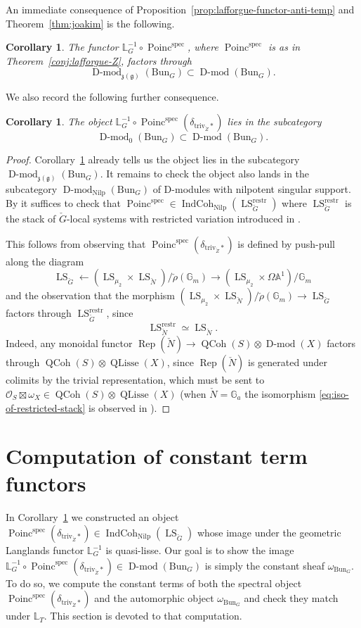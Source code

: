 \documentclass[11pt]{amsart}
\newcommand{\fg}{\mathfrak{g}}
\newcommand{\fz}{\mathfrak{z}}
\newcommand{\bG}{\mathbb{G}}
\newcommand{\bA}{\mathbb{A}}
\newcommand{\cO}{{\mathcal O}}
\newcommand{\triv}{\mathrm{triv}}
\newcommand{\spec}{\mathrm{spec}}
\newcommand{\Rep}{\operatorname{Rep}}
\newcommand{\Bun}{{\mathrm{Bun}}}
\newcommand{\Poinc}{\operatorname{Poinc}}
\newcommand{\Nilp}{\mathrm{Nilp}}
\DeclareMathOperator{\QCoh}{QCoh}
\DeclareMathOperator{\Dmod}{D-mod}
\DeclareMathOperator{\IndCoh}{IndCoh}
\DeclareMathOperator{\LS}{LS}
\newtheorem{cor}[thm]{Corollary}
\theoremstyle{remark}
\theoremstyle{definition}
\begin{document}
An immediate consequence of Proposition~\ref{prop:lafforgue-functor-anti-temp} and Theorem~\ref{thm:joakim} is the following.
\begin{cor}\label{cor:poincare-factors}
    The functor $\mathbb L_G^{-1}\circ\Poinc^\spec$, where $\Poinc^\spec$ is as in Theorem~\ref{conj:lafforgue-Z}, factors through
    \[
    \Dmod_{\fz(\fg)}(\Bun_G)\subset\Dmod(\Bun_G).
    \]
\end{cor}
We also record the following further consequence.
\begin{cor}\label{cor:poincare-factors2}
    The object $\mathbb L_G^{-1}\circ\Poinc^\spec(\delta_{\triv_{\check Z}*})$ lies in the subcategory
    \[
    \Dmod_0(\Bun_G)\subset\Dmod(\Bun_G).
    \]
\end{cor}
\begin{proof}
    Corollary~\ref{cor:poincare-factors} already tells us the object lies in the subcategory $\Dmod_{\fz(\fg)}(\Bun_G)$. It remains to check the object also lands in the subcategory $\Dmod_\Nilp(\Bun_G)$ of D-modules with nilpotent singular support. By \cite[Proposition~14.5.3]{AGKRRV} it suffices to check that $\Poinc^\spec\in\IndCoh_\Nilp(\LS_{\check G}^{\mathrm{restr}})$ where $\LS_{\check G}^{\mathrm{restr}}$ is the stack of $\check G$-local systems with restricted variation introduced in \cite[\S1.4]{AGKRRV}.

This follows from observing that $\Poinc^\spec(\delta_{\triv_{\check Z}*})$ is defined by push-pull along the diagram
\[
\LS_{\check G}\leftarrow(\LS_{\mu_2}\times\LS_{\check N})/\check\rho(\bG_m)\to (\LS_{\mu_2}\times\Omega\bA^1)/\bG_m
\]
and the observation that the morphism $(\LS_{\mu_2}\times\LS_{\check N})/\check\rho(\bG_m)\to\LS_{\check G}$ factors through $\LS_{\check G}^{\mathrm{restr}}$, since 
\begin{equation}\label{eq:iso-of-restricted-stack}\LS_{\check N}^{\mathrm{restr}}\simeq\LS_{\check N}.\end{equation}
Indeed, any monoidal functor $\Rep(\check N)\to\QCoh(S)\otimes\Dmod(X)$ factors through $\QCoh(S)\otimes\operatorname{QLisse}(X)$, since $\Rep(\check N)$ is generated under colimits by the trivial representation, which must be sent to $\cO_S\boxtimes\omega_X\in\QCoh(S)\otimes\operatorname{QLisse}(X)$ (when $\check N=\bG_a$ the isomorphism \eqref{eq:iso-of-restricted-stack} is observed in \cite[\S1.5.2]{AGKRRV}).
\end{proof}

\section{Computation of constant term functors}\label{sec:some-computations}
In Corollary~\ref{cor:poincare-factors2} we constructed an object $\Poinc^\spec(\delta_{\triv_{\check Z}*})\in\IndCoh_\Nilp(\LS_{\check G})$ whose image under the geometric Langlands functor $\mathbb L_G^{-1}$ is quasi-lisse. Our goal is to show the image $\mathbb L_G^{-1}\circ\Poinc^\spec(\delta_{\triv_{\check Z}*})\in\Dmod(\Bun_G)$ is simply the constant sheaf $\omega_{\Bun_G}$. To do so, we compute the constant terms of both the spectral object $\Poinc^\spec(\delta_{\triv_{\check Z}*})$ and the automorphic object $\omega_{\Bun_G}$ and check they match under $\mathbb L_T$. This section is devoted to that computation.
\end{document}
